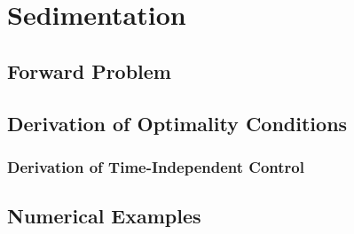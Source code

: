 \documentclass[11pt, a4paper]{article}
\theoremstyle{definition}
\begin{document}
	\section{Sedimentation}
	\subsection{Forward Problem}
	
	\subsection{Derivation of Optimality Conditions}
	
	\subsubsection{Derivation of Time-Independent Control}
	
	
	\subsection{Numerical Examples}
	
	


	
	\pagebreak	
	
	
	
\end{document}
